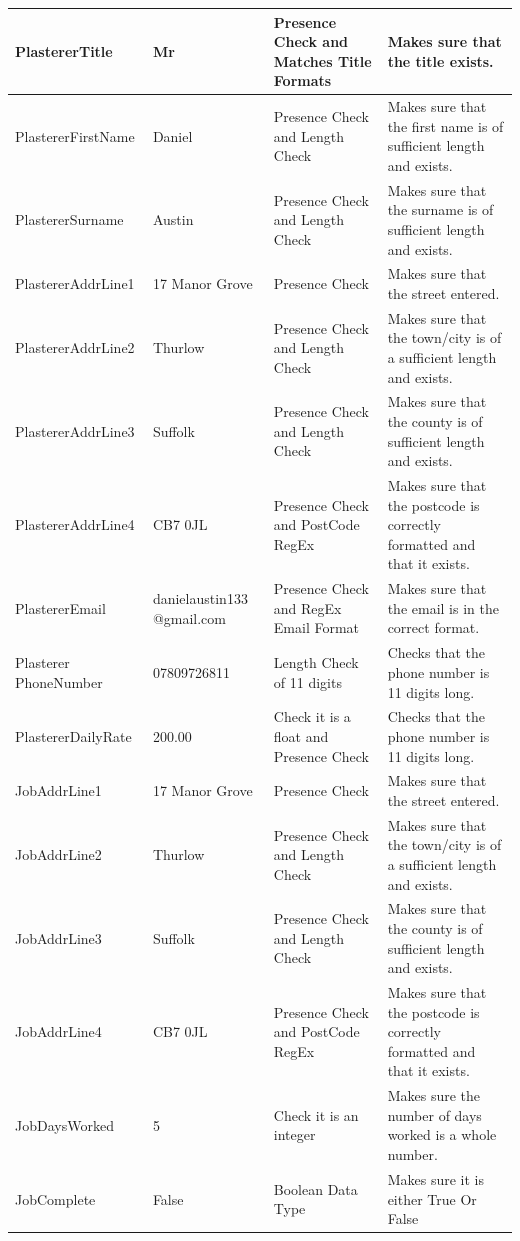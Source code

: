 \begin{longtable}{|p{3cm}|p{3cm}|p{3cm}|p{3cm}|}
PlastererTitle & Mr & Presence Check and Matches Title Formats  & Makes sure that the title exists. \\ \hline
PlastererFirstName & Daniel & Presence Check and Length Check & Makes sure that the first name is of sufficient length and exists. \\ \hline
PlastererSurname & Austin & Presence Check and Length Check & Makes sure that the surname is of sufficient length and exists. \\ \hline
PlastererAddrLine1 & 17 Manor Grove & Presence Check & Makes sure that the street entered. \\ \hline
PlastererAddrLine2 & Thurlow & Presence Check and Length Check & Makes sure that the town/city is of a sufficient length and exists. \\ \hline
PlastererAddrLine3 & Suffolk & Presence Check and Length Check & Makes sure that the county is of sufficient length and exists. \\ \hline
PlastererAddrLine4 & CB7 0JL & Presence Check and PostCode RegEx & Makes sure that the postcode is correctly formatted and that it exists. \\ \hline
PlastererEmail & danielaustin133 @gmail.com & Presence Check and RegEx Email Format & Makes sure that the email is in the correct format. \\ \hline
Plasterer PhoneNumber & 07809726811 & Length Check of 11 digits & Checks that the phone number is 11 digits long. \\ \hline
PlastererDailyRate & 200.00 & Check it is a float and Presence Check & Checks that the phone number is 11 digits long. \\ \hline \hline

JobAddrLine1 & 17 Manor Grove & Presence Check & Makes sure that the street entered. \\ \hline
JobAddrLine2 & Thurlow & Presence Check and Length Check & Makes sure that the town/city is of a sufficient length and exists. \\ \hline
JobAddrLine3 & Suffolk & Presence Check and Length Check & Makes sure that the county is of sufficient length and exists. \\ \hline
JobAddrLine4 & CB7 0JL & Presence Check and PostCode RegEx & Makes sure that the postcode is correctly formatted and that it exists. \\ \hline
JobDaysWorked & 5 & Check it is an integer & Makes sure the number of days worked is a whole number. \\ \hline
JobComplete & False & Boolean Data Type & Makes sure it is either True Or False \\ \hline \hline



\end{longtable}
